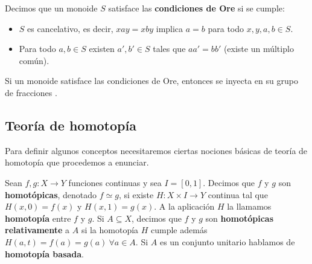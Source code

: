 \documentclass[bibtex, anon]{TEMat-article}
\begin{document}
\begin{definicion}\label{condiciones}
	Decimos que un monoide $S$ satisface las \textbf{condiciones de Ore} \cite{Ore} si se cumple:
	\begin{itemize}
		\item $S$ es cancelativo, es decir, $xay=xby$ implica $a=b$ para todo $x,y,a,b\in S$. 
		\item Para todo $a,b\in S$ existen $a',b'\in S$ tales que $aa'=bb'$ (existe un múltiplo común). 
	\end{itemize}
\end{definicion}

\begin{prop}\cite[Teorema 1.23]{Clifford}
	Si un monoide satisface las condiciones de Ore, entonces se inyecta en su grupo de fracciones .
\end{prop}

\subsection{Teoría de homotopía}


Para definir algunos conceptos necesitaremos ciertas nociones básicas de teoría de homotopía que procedemos a enunciar.

\begin{definicion} Sean $f,g:X\to Y$ funciones continuas y sea $I=[0,1]$. Decimos que $f$ y $g$ son \textbf{homotópicas}, denotado $f\simeq g$, si existe $H:X\times I\to Y$ continua tal que $H(x,0)=f(x)$ y $H(x,1)=g(x)$. A la aplicación $H$ la llamamos \textbf{homotopía} entre $f$ y $g$. %
		Si $A\subseteq X$, decimos que $f$ y $g$ son \textbf{homotópicas relativamente} a $A$ si la homotopía $H$ cumple además $H(a,t)=f(a)=g(a)\ \forall a\in A$. Si $A$ es un conjunto unitario hablamos de \textbf{homotopía basada}. %
\end{definicion}
\end{document}
